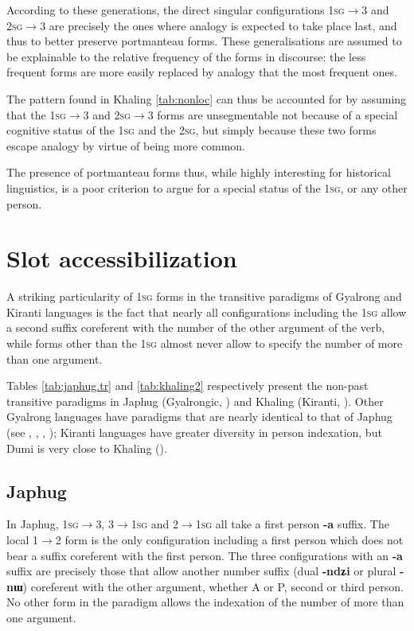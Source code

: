 \documentclass{article}
\newcommand{\ipa}[1]{{\phon\textbf{#1}}}
\begin{document}
According to these generations, the  direct singular configurations \textsc{1sg$\rightarrow$3} and \textsc{2sg$\rightarrow$3} are precisely the ones where analogy is expected to take place last, and thus to better preserve portmanteau forms. These generalisations are assumed to be explainable to the relative frequency of the forms in discourse: the less frequent forms are more easily replaced by analogy that the most frequent ones.

The pattern found in Khaling \ref{tab:nonloc} can thus be accounted for by assuming that the \textsc{1sg$\rightarrow$3} and \textsc{2sg$\rightarrow$3} forms are unsegmentable not because of a special cognitive status of the \textsc{1sg} and the \textsc{2sg}, but simply because these two forms escape analogy by virtue of being more common. 

The presence of portmanteau forms thus, while highly interesting for historical linguistics, is a poor criterion to argue for a special status of the \textsc{1sg}, or any other person.

\section{Slot accessibilization}
A striking particularity of \textsc{1sg} forms in the transitive paradigms of Gyalrong and Kiranti languages is the fact that nearly all configurations including the \textsc{1sg}  allow a second suffix coreferent with the number of the other argument of the verb, while forms other than the \textsc{1sg} 
almost never allow to specify the number of more than one argument.

Tables \ref{tab:japhug.tr} and \ref{tab:khaling2} respectively present the non-past transitive paradigms  in Japhug (Gyalrongic, \citealt{jacques10inverse}) and Khaling (Kiranti, \citealt[1102]{jacques12khaling}). Other Gyalrong languages have paradigms that are nearly identical to that of Japhug (see \citealt{delancey81direction}, \citealt{jackson02rentongdengdi}, \citealt{gongxun14agreement}, \citealt{zhang16bragdbar}); Kiranti languages have greater diversity in person indexation, but Dumi is very close to Khaling (\citealt{driem93agreement}).

\subsection{Japhug}

In Japhug, \textsc{1sg}$\rightarrow$3, 3$\rightarrow$\textsc{1sg} and 2$\rightarrow$\textsc{1sg} all take a first person \ipa{-a} suffix. The  local 1$\rightarrow$2 form is the only configuration including a first person which does not bear a suffix coreferent with the first person. The three configurations with an \ipa{-a} suffix are precisely those that allow another number suffix (dual \ipa{-ndʑi} or plural \ipa{-nɯ}) coreferent with the other argument, whether A or P, second or third person. No other form in the paradigm allows the indexation of the number of more than one argument.
\end{document}
